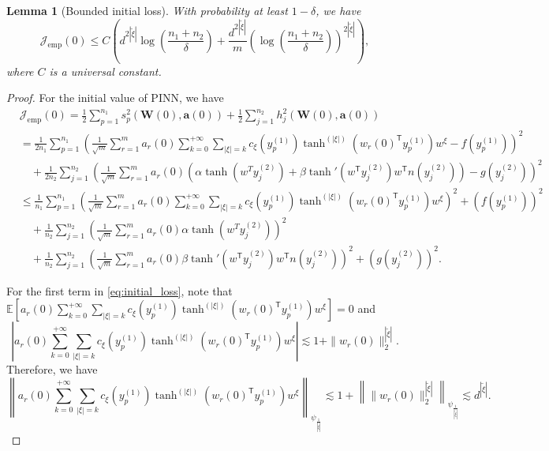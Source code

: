 \documentclass{article}
\newtheorem{lemma}{Lemma}
\newcommand{\T}{\mathsf{T}}
\begin{document}
\begin{lemma}[Bounded initial loss]\label{lem:initial_loss}
	With probability at least $1-\delta$, we have
	\begin{equation}
		\mathcal{J}_{\text{emp}}(0)\leq C\left( d^{2|\tilde{\xi}|}\log\left(\frac{n_1+n_2}{\delta}\right)+\frac{d^{2|\tilde{\xi}|}}{m} \left(\log\left(\frac{n_1+n_2}{\delta}\right)\right)^{2|\tilde{\xi}|}  \right),
	\end{equation}
	where $C$ is a universal constant.
\end{lemma}
\begin{proof}
	For the initial value of PINN, we have 
	\begin{equation}
		\begin{aligned}
			&\mathcal{J}_{\text{emp}}(0)=\frac{1}{2}\sum\limits_{p=1}^{n_1}s_p^2(\mathbf{W}(0), \mathbf{a}(0))+\frac{1}{2}\sum\limits_{j=1}^{n_2}h_j^2(\mathbf{W}(0), \mathbf{a}(0)) \\
			&= \frac{1}{2n_1}\sum\limits_{p=1}^{n_1} \left(\frac{1}{\sqrt{m}} \sum\limits_{r=1}^m a_r(0) \sum_{k=0}^{+\infty} \sum_{|\xi|=k} c_{\xi}(y_p^{(1)}) \tanh^{(|\xi|)}(w_r(0)^\T y_p^{(1)})w^{\xi}-f(y_p^{(1)}) \right)^2\\
			&\quad + \frac{1}{2n_2}\sum\limits_{j=1}^{n_2} \left(\frac{1}{\sqrt{m}} \sum\limits_{r=1}^m a_r(0)(\alpha \tanh(w^T y_{j}^{(2)})+\beta \tanh'(w^\T y_{j}^{(2)})w^\T n(y_{j}^{(2)}))-g(y_j^{(2)})\right)^2\\
			&\leq \frac{1}{n_1}\sum\limits_{p=1}^{n_1} \left(\frac{1}{\sqrt{m}} \sum\limits_{r=1}^m a_r(0) \sum_{k=0}^{+\infty} \sum_{|\xi|=k} c_{\xi}(y_p^{(1)}) \tanh^{(|\xi|)}(w_r(0)^\T y_p^{(1)})w^{\xi}\right)^2+(f(y_p^{(1)}) )^2\\
			&\quad + \frac{1}{n_2}\sum\limits_{j=1}^{n_2} \left(\frac{1}{\sqrt{m}} \sum\limits_{r=1}^m a_r(0)\alpha \tanh(w^T y_{j}^{(2)})\right)^2\\ 
            &\quad + \frac{1}{n_2}\sum\limits_{j=1}^{n_2} \left(\frac{1}{\sqrt{m}} \sum\limits_{r=1}^m a_r(0)\beta \tanh'(w^\T y_{j}^{(2)})w^\T n(y_{j}^{(2)})\right)^2+(g(y_j^{(2)}))^2.\label{eq:initial_loss}
		\end{aligned}
	\end{equation}

	For the first term in \cref{eq:initial_loss}, note that $\mathbb{E}\left[a_r(0)\sum_{k=0}^{+\infty} \sum_{|\xi|=k} c_{\xi}(y_p^{(1)}) \tanh^{(|\xi|)}(w_r(0)^\T y_p^{(1)})w^{\xi}\right]=0$ and
	\begin{equation*}
		\left|a_r(0)\sum_{k=0}^{+\infty} \sum_{|\xi|=k} c_{\xi}(y_p^{(1)}) \tanh^{(|\xi|)}(w_r(0)^\T y_p^{(1)})w^{\xi}\right|\lesssim 1+ \|w_r(0)\|_{2}^{|\tilde{\xi}|} .
	\end{equation*}
	Therefore, we have
	\begin{equation*}
         \left\|  a_r(0)\sum_{k=0}^{+\infty} \sum_{|\xi|=k} c_{\xi}(y_p^{(1)}) \tanh^{(|\xi|)}(w_r(0)^\T y_p^{(1)})w^{\xi} \right\|_{\psi_{\frac{1}{|\tilde{\xi}|}}}\lesssim 1+ \left\|\|w_r(0)\|_{2}^{|\tilde{\xi}|}\right\|_{\psi_{\frac{1}{|\tilde{\xi}|}}}\lesssim d^{|\tilde{\xi}|}.
    \end{equation*}


\end{proof}
\end{document}
